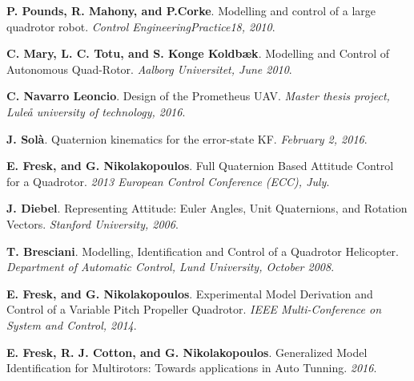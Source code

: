 \documentclass[11pt, a4paper, onecolumn, fleqn, twoside, titlepage, openright]{book}
\begin{document}
	



	



	\begin{thebibliography}{1}
	\label{bibliography}

		\textbf{P. Pounds, R. Mahony, and P.Corke}.
		Modelling and control of a large quadrotor robot.
		\textit{Control EngineeringPractice18, 2010}.

		\textbf{C. Mary, L. C. Totu, and S. Konge Koldbæk}.
		Modelling and Control of Autonomous Quad-Rotor.	
		\textit{Aalborg Universitet, June 2010}.

		\textbf{C. Navarro Leoncio}.
		Design of the Prometheus UAV.
		\textit{Master thesis project, Lule\r{a} university of technology, 2016}.

		\textbf{J. Solà}.
		Quaternion kinematics for the error-state KF.
		\textit{February 2, 2016}.

		\textbf{E. Fresk, and G. Nikolakopoulos}.
		Full Quaternion Based Attitude Control for a Quadrotor.
		\textit{2013 European Control Conference (ECC), July}.

		\textbf{J. Diebel}.
		Representing Attitude: Euler Angles, Unit Quaternions, and Rotation Vectors.
		\textit{Stanford University, 2006}.

		\textbf{T. Bresciani}.
		Modelling, Identification and Control of a Quadrotor Helicopter.
		\textit{Department of Automatic Control, Lund University, October 2008}.

		\textbf{E. Fresk, and G. Nikolakopoulos}.
		Experimental Model Derivation and Control of a Variable Pitch Propeller Quadrotor.
		\textit{IEEE Multi-Conference on System and Control, 2014}.

		\textbf{E. Fresk, R. J. Cotton, and G. Nikolakopoulos}.
		Generalized Model Identification for Multirotors: Towards applications in Auto Tunning.
		\textit{2016}.		


\end{thebibliography}
\end{document}
